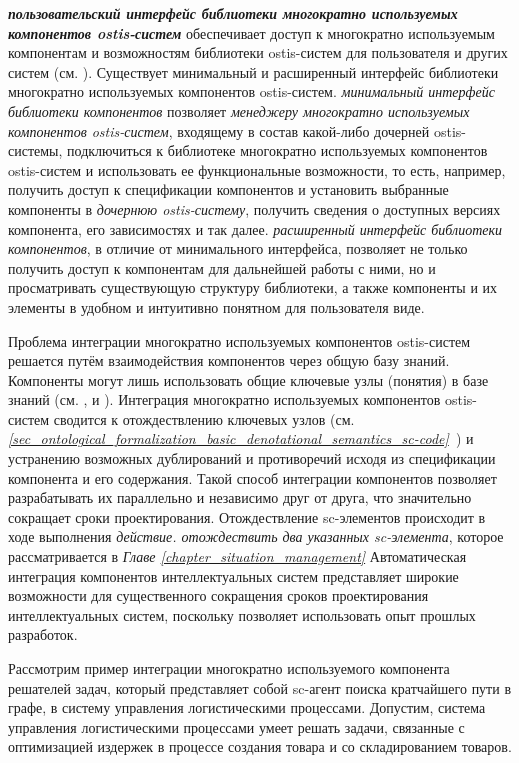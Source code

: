 \textbf{\textit{пользовательский интерфейс библиотеки многократно используемых компонентов ostis-систем}} обеспечивает доступ к многократно используемым компонентам и возможностям библиотеки ostis-систем для пользователя и других систем (см. ). Существует минимальный и расширенный интерфейс библиотеки многократно используемых компонентов ostis-систем. \textit{минимальный интерфейс библиотеки компонентов} позволяет \textit{менеджеру многократно используемых компонентов ostis-систем}, входящему в состав какой-либо дочерней ostis-системы, подключиться к библиотеке многократно используемых компонентов ostis-систем и использовать ее функциональные возможности, то есть, например, получить доступ к спецификации компонентов и установить выбранные компоненты в \textit{дочернюю ostis-систему}, получить сведения о доступных версиях компонента, его зависимостях и так далее. \textit{расширенный интерфейс библиотеки компонентов}, в отличие от минимального интерфейса, позволяет не только получить доступ к компонентам для дальнейшей работы с ними, но и просматривать существующую структуру библиотеки, а также компоненты и их элементы в удобном и интуитивно понятном для пользователя виде.

Проблема интеграции многократно используемых компонентов ostis-систем решается путём взаимодействия компонентов через общую базу знаний. Компоненты могут лишь использовать общие ключевые узлы (понятия) в базе знаний (см. ,  и ). Интеграция многократно используемых компонентов ostis-систем сводится к отождествлению ключевых узлов (см. \textit{\ref{sec_ontological_formalization_basic_denotational_semantics_sc-code}~}) и устранению возможных дублирований и противоречий исходя из спецификации компонента и его содержания. Такой способ интеграции компонентов позволяет разрабатывать их параллельно и независимо друг от друга, что значительно сокращает сроки проектирования. Отождествление sc-элементов происходит в ходе выполнения \textit{действие. отождествить два указанных sc-элемента}, которое рассматривается в \textit{Главе \ref{chapter_situation_management}} Автоматическая интеграция компонентов интеллектуальных систем представляет широкие возможности для существенного сокращения сроков проектирования интеллектуальных систем, поскольку позволяет использовать опыт прошлых разработок.

Рассмотрим пример интеграции многократно используемого компонента решателей задач, который представляет собой sc-агент поиска кратчайшего пути в графе, в систему управления логистическими процессами. Допустим, система управления логистическими процессами умеет решать задачи, связанные с оптимизацией издержек в процессе создания товара и со складированием товаров. 

